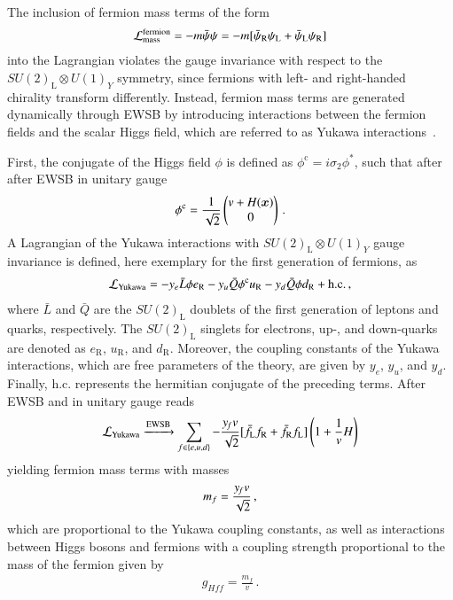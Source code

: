 The inclusion of fermion mass terms of the form
\begin{align*}
  \mathcal{L}_{\text{mass}}^{\text{fermion}} = - m \bar{\psi} \psi = - m [ \bar{\psi}_\text{R} \psi_\text{L} + \bar{\psi}_\text{L} \psi_\text{R} ]
\end{align*}
into the Lagrangian violates the gauge invariance with respect to the
$SU(2)_{\text{L}} \otimes U(1)_Y$ symmetry, since fermions with left- and
right-handed chirality transform differently. Instead, fermion mass terms are
generated dynamically through EWSB by introducing interactions between the
fermion fields and the scalar Higgs field, which are referred to as Yukawa
interactions~\cite{Yukawa:1935xg}.

First, the conjugate of the Higgs field $\phi$ is defined as
$\phi^{\text{c}} = i \sigma_2 \phi^*$, such that after after EWSB in unitary
gauge
\begin{align*}
  \phi^{\text{c}} = \frac{1}{\sqrt{2}}
  \begin{pmatrix}
    v + H(\bm{x}) \\
    0
  \end{pmatrix} \,\text{.}
\end{align*}
A Lagrangian of the Yukawa interactions with $SU(2)_{\text{L}} \otimes U(1)_Y$
gauge invariance is defined, here exemplary for the first generation of
fermions, as
\begin{align}
  \mathcal{L}_{\text{Yukawa}} =
  - y_e \bar{L} \phi e_{\text{R}}
  - y_u \bar{Q} \phi^{\text{c}} u_{\text{R}}
  - y_d \bar{Q} \phi d_{\text{R}}
  + \text{h.c.} \,\text{,}
  \label{eq:lagrangian_yukawa}
\end{align}
where $\bar{L}$ and $\bar{Q}$ are the $SU(2)_{\text{L}}$ doublets of the first
generation of leptons and quarks, respectively. The $SU(2)_{\text{L}}$ singlets
for electrons, up-, and down-quarks are denoted as $e_{\text{R}}$,
$u_{\text{R}}$, and $d_{\text{R}}$. Moreover, the coupling constants of the
Yukawa interactions, which are free parameters of the theory, are given by
$y_e$, $y_u$, and $y_d$. Finally, $\text{h.c.}$ represents the hermitian
conjugate of the preceding terms. After EWSB and in unitary gauge
 reads
\begin{align*}
  \mathcal{L}_{\text{Yukawa}} \xrightarrow{\text{EWSB}} \sum_{f \in \{e, u, d\}} -\frac{y_{\hspace{-0.1em}f} v}{\sqrt{2}} [ \bar{f}_{\text{L}} f_{\text{R}} + \bar{f}_{\text{R}} f_{\text{L}} ] \left( 1 + \frac{1}{v} H \right)
\end{align*}
yielding fermion mass terms with masses
\begin{align*}
  m_{f} = \frac{y_{\hspace{-0.1em}f} v}{\sqrt{2}} \,\text{,}
\end{align*}
which are proportional to the Yukawa coupling constants, as well as interactions
between Higgs bosons and fermions with a coupling strength proportional to the
mass of the fermion given by
\begin{align*}
  g_{H\!f\!f} = \frac{m_f}{v} \,\text{.}
\end{align*}

